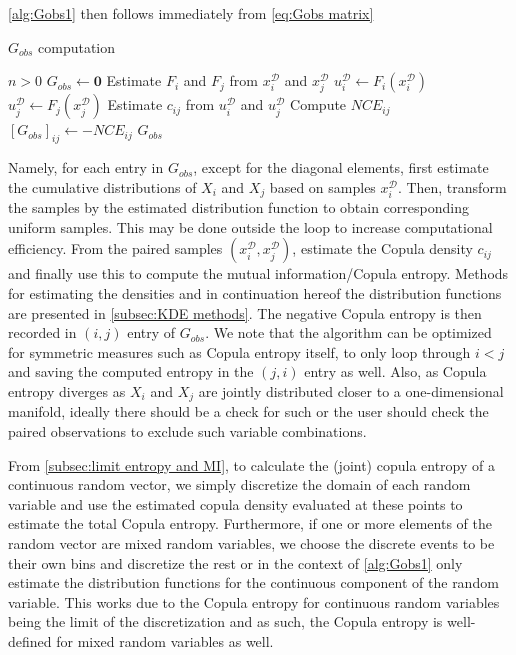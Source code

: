 \documentclass[../Thesis.tex]{subfiles}
\begin{document}
\autoref{alg:Gobs1} then follows immediately from \autoref{eq:Gobs matrix}
\begin{algorithm}[H]
    \caption{$G_{obs}$ computation}\label{alg:Gobs1}
    \begin{algorithmic}
        \Require $n > 0$             
        \State $G_{obs} \gets \boldsymbol 0$
        \State Estimate $F_i$ and $F_j$ from $x_i^{\mathcal{D}}$ and $x_j^{\mathcal{D}}$
        \State $u_i^{\mathcal{D}} \gets F_i(x_i^{\mathcal{D}})$
        \State $u_j^{\mathcal{D}} \gets F_j(x_j^{\mathcal{D}})$
        \State Estimate $c_{ij}$ from $u_i^{\mathcal{D}}$ and $u_j^{\mathcal{D}}$
        \State Compute $NCE_{ij}$
        \State $\left[G_{obs}\right]_{ij} \gets -NCE_{ij}$
        \EndFor
        \State \Return $G_{obs}$
    \end{algorithmic}
\end{algorithm}
Namely, for each entry in $G_{obs}$, except for the diagonal elements, first estimate the cumulative distributions of $X_i$ and $X_j$ based on samples $x_i^{\mathcal{D}}$. Then, transform the samples by the estimated distribution function to obtain corresponding uniform samples. This may be done outside the loop to increase computational efficiency. From the paired samples $(x_i^{\mathcal{D}},x_j^{\mathcal{D}})$, estimate the Copula density $c_{ij}$ and finally use this to compute the mutual information/Copula entropy. Methods for estimating the densities and in continuation hereof the distribution functions are presented in \autoref{subsec:KDE methods}. The negative Copula entropy is then recorded in $(i,j)$ entry of $G_{obs}$. We note that the algorithm can be optimized for symmetric measures such as Copula entropy itself, to only loop through $i<j$ and saving the computed entropy in the $(j,i)$ entry as well. Also, as Copula entropy diverges as $X_i$ and $X_j$ are jointly distributed closer to a one-dimensional manifold, ideally there should be a check for such or the user should check the paired observations to exclude such variable combinations.

From \autoref{subsec:limit entropy and MI}, to calculate the (joint) copula entropy of a continuous random vector, we simply discretize the domain of each random variable and use the estimated copula density evaluated at these points to estimate the total Copula entropy. Furthermore, if one or more elements of the random vector are mixed random variables, we choose the discrete events to be their own bins and discretize the rest or in the context of \autoref{alg:Gobs1} only estimate the distribution functions for the continuous component of the random variable. This works due to the Copula entropy for continuous random variables being the limit of the discretization and as such, the Copula entropy is well-defined for mixed random variables as well.
\end{document}
